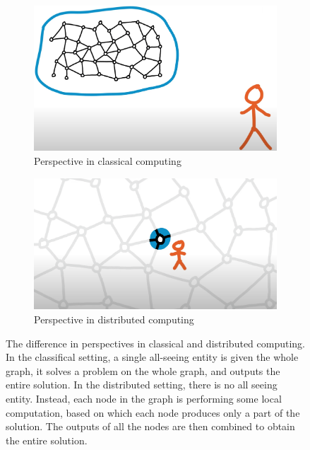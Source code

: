 \begin{figure}
  \centering
  \begin{subfigure}[b]{0.49\textwidth}
      \centering
      \includegraphics[width=\textwidth]{images/classical-computing.png}
      \caption{Perspective in classical computing}
      \label{fig:classical-computing}
  \end{subfigure}
  \hfill
  \begin{subfigure}[b]{0.49\textwidth}
      \centering
      \includegraphics[width=\textwidth]{images/distributed-computing.png}
      \caption{Perspective in distributed computing}
      \label{fig:three sin x}
  \end{subfigure}
  \caption{
    The difference in perspectives in classical and distributed computing\protect\footnotemark.
    In the classifical setting, a single all-seeing entity is given the whole graph,
    it solves a problem on the whole graph, and outputs the entire solution.
    In the distributed setting, there is no all seeing entity. Instead, each node
    in the graph is performing some local computation, based on which each node
    produces only a part of the solution. The outputs of all the nodes are then combined
    to obtain the entire solution.
  }
  \label{fig:classical-vs-distributed-computing}
\end{figure}

